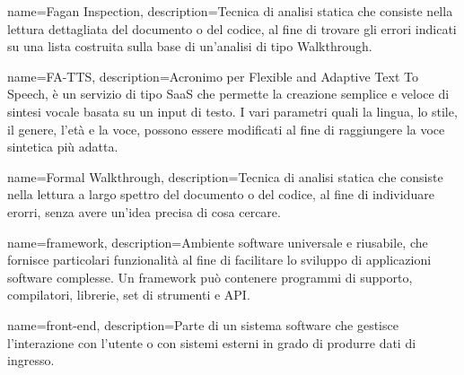 {
	name=Fagan Inspection,
	description={Tecnica di analisi statica che consiste nella lettura dettagliata del documento o del codice, al fine di trovare gli errori indicati su una lista costruita sulla base di un'analisi di tipo Walkthrough.}
}

{
	name=FA-TTS,
	description={Acronimo per Flexible and Adaptive Text To Speech, è un servizio di tipo SaaS che permette la creazione semplice e veloce di sintesi vocale basata su un input di testo. I vari parametri quali la lingua, lo stile, il genere, l'età e la voce, possono essere modificati al fine di raggiungere la voce sintetica più adatta.}
}

{
	name=Formal Walkthrough,
	description={Tecnica di analisi statica che consiste nella lettura a largo spettro del documento o del codice, al fine di individuare erorri, senza avere un'idea precisa di cosa cercare.}
}

{
	name=framework,
	description={Ambiente software universale e riusabile, che fornisce particolari funzionalità al fine di facilitare lo sviluppo di applicazioni software complesse. Un framework può contenere programmi di supporto, compilatori, librerie, set di strumenti e API.}
}

{
	name=front-end,
	description={Parte di un sistema software che gestisce l'interazione con l'utente o con sistemi esterni in grado di produrre dati di ingresso.}
}